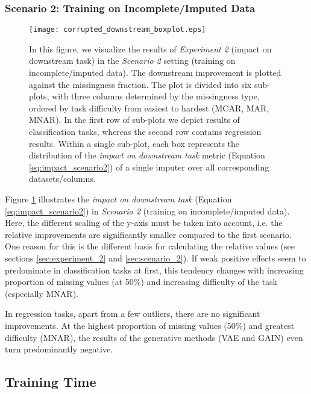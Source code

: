 \subsubsection{Scenario 2: Training on Incomplete/Imputed Data}


\begin{figure}\centering
	\texttt{[image: corrupted\_downstream\_boxplot.eps]}

	\caption[Downstream Ranks - Corrupted]{In this figure, we visualize the results of \textit{Experiment 2} (impact on downstream task) in the \textit{Scenario 2} setting (training on incomplete/imputed data). The downstream improvement is plotted against the missingness fraction. The plot is divided into six sub-plots, with three columns determined by the missingness type, ordered by task difficulty from easiest to hardest (MCAR, MAR, MNAR). In the first row of sub-plots we depict results of classification tasks, whereas the second row contains regression results. Within a single sub-plot, each box represents the distribution of the \textit{impact on downstream task} metric (Equation \ref{eq:impact_scenario2}) of a single imputer over all corresponding datasets/columns.
    }
	\label{fig:corrupted_downstream_boxplot}
\end{figure}

Figure \ref{fig:corrupted_downstream_boxplot} illustrates the \textit{impact on downstream task} (Equation \ref{eq:impact_scenario2}) in \textit{Scenario 2} (training on incomplete/imputed data). Here, the different scaling of the y-axis must be taken into account, i.e. the relative improvements are significantly smaller compared to the first scenario. One reason for this is the different basis for calculating the relative values (see sections \ref{sec:experiment_2} and \ref{sec:scenario_2}). If weak positive effects seem to predominate in classification tasks at first, this tendency changes with increasing proportion of missing values (at 50\%) and increasing difficulty of the task (especially MNAR).

In regression tasks, apart from a few outliers, there are no significant improvements. At the highest proportion of missing values (50\%) and greatest difficulty (MNAR), the results of the generative methods (VAE and GAIN) even turn predominantly negative.



\subsection{Training Time}

